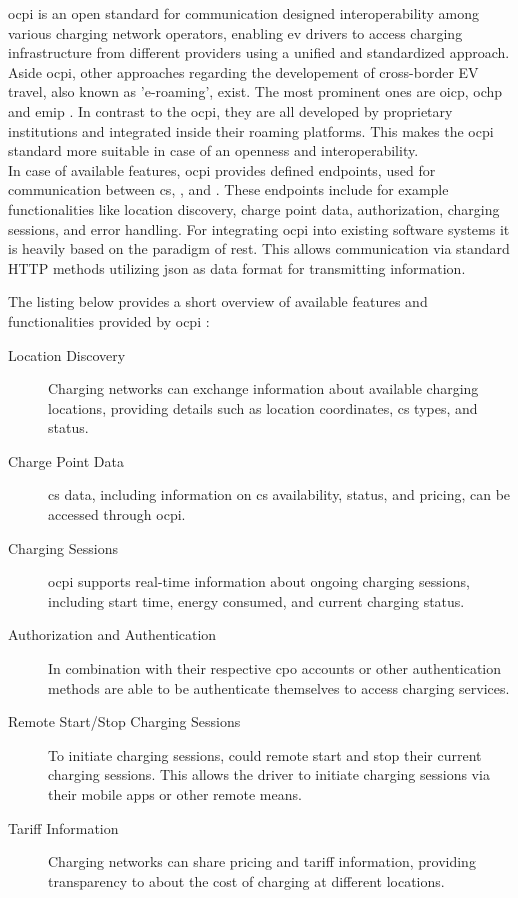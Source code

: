 \acrfull{ocpi} is an open standard for communication designed interoperability among various charging network operators, enabling \acrshort{ev} drivers to access charging infrastructure from different providers using a unified and standardized approach. 
Aside \acrshort{ocpi}, other approaches regarding the developement of cross-border EV travel, also known as 'e-roaming', exist. 
The most prominent ones are \acrfull{oicp}, \acrfull{ochp} and \acrfull{emip} \cite{ferwerda_advancing_2018}. 
In contrast to the \acrshort{ocpi}, they are all developed by proprietary institutions and integrated inside their roaming platforms.
This makes the \acrshort{ocpi} standard more suitable in case of an openness and interoperability. \\
\noindent In case of available features, \acrshort{ocpi} provides defined endpoints, used for communication between \acrshort{cs}, ,  and . These endpoints include for example functionalities like location discovery, charge point data, authorization, charging sessions, and error handling. 
For integrating \acrshort{ocpi} into existing software systems it is heavily based on the paradigm of \acrfull{rest}. This allows communication via standard HTTP methods utilizing \acrfull{json} as data format for transmitting information. 

The listing below provides a short overview of available features and functionalities provided by \acrshort{ocpi} \cite{noauthor_open_2021}:

\begin{description}
    \item[Location Discovery] Charging networks can exchange information about available charging locations, providing details such as location coordinates, \acrshort{cs} types, and status.
    \item[Charge Point Data] \acrshort{cs} data, including information on \acrshort{cs} availability, status, and pricing, can be accessed through \acrshort{ocpi}.
    \item[Charging Sessions] \acrshort{ocpi} supports real-time information about ongoing charging sessions, including start time, energy consumed, and current charging status.
    \item[Authorization and Authentication] In combination with their respective \acrshort{cpo} accounts or other authentication methods  are able to be authenticate themselves to access charging services.
    \item[Remote Start/Stop Charging Sessions] To initiate charging sessions,  could remote start and stop their current charging sessions. This allows the driver to initiate charging sessions via their mobile apps or other remote means.
    \item[Tariff Information] Charging networks can share pricing and tariff information, providing transparency to  about the cost of charging at different locations.
\end{description}

